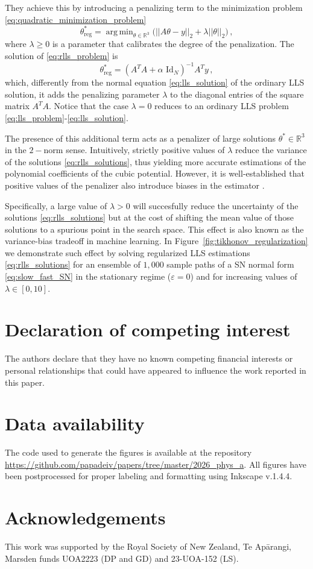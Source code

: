 \documentclass[a4paper,fleqn]{cas-sc}
\DeclareMathOperator*{\argmin}{\arg\,min}
\newcommand{\fref}[1]{Figure~\ref{#1}}
\begin{document}
They achieve this by introducing a penalizing term to the minimization problem \eqref{eq:quadratic_minimization_problem} 
\begin{equation}\label{eq:rlls_problem}
        \theta^*_{\text{reg}} = \argmin_{\theta\in\mathbb{R}^3}\big(||A\theta - y||_2 + \lambda||\theta||_2\big)\,,
\end{equation}
where $\lambda\geq0$ is a parameter that calibrates the degree of the penalization.
The solution of \eqref{eq:rlls_problem} is
\begin{equation}\label{eq:rlls_solutions}
        \theta^*_{\text{reg}} = (A^{T}A + \alpha\text{ Id}_N)^{-1}A^{T}y\,,
\end{equation}
which, differently from the normal equation \eqref{eq:lls_solution} of the ordinary LLS solution, it adds the penalizing parameter $\lambda$ to the diagonal entries of the square matrix $A^TA$.
Notice that the case $\lambda=0$ reduces to an ordinary LLS problem \eqref{eq:lls_problem}-\eqref{eq:lls_solution}.

The presence of this additional term acts as a penalizer of large solutions $\theta^*\in \mathbb{R}^{3}$ in the $2-$norm sense.
Intuitively, strictly positive values of $\lambda$ reduce the variance of the solutions \eqref{eq:rlls_solutions}, thus yielding more accurate estimations of the polynomial coefficients of the cubic potential.
However, it is well-established that positive values of the penalizer also introduce biases in the estimator \cite{Hoerl1970}.

Specifically, a large value of $\lambda>0$ will succesfully reduce the uncertainty of the solutions \eqref{eq:rlls_solutions} but at the cost of shifting the mean value of those solutions to a spurious point in the search space.
This effect is also known as the variance-bias tradeoff in machine learning. 
In \fref{fig:tikhonov_regularization} we demonstrate such effect by solving regularized LLS estimations \eqref{eq:rlls_solutions} for an ensemble of $1,000$ sample paths of a SN normal form \eqref{eq:slow_fast_SN} in the stationary regime ($\varepsilon=0$) and for increasing values of $\lambda\in[0,10]$.
\printcredits
%
\section*{Declaration of competing interest}
The authors declare that they have no known competing financial interests or personal relationships that could have appeared to influence the work reported in this paper.
%
\section*{Data availability}
The code used to generate the figures is available at the repository \url{https://github.com/papadeiv/papers/tree/master/2026_phys_a}.
All figures have been postprocessed for proper labeling and formatting using Inkscape v.1.4.4.
%
\section*{Acknowledgements}
This work was supported by the Royal Society of New Zealand, Te Ap\={a}rangi, Marsden funds UOA2223 (DP and GD) and 23-UOA-152 (LS).
%


\end{document}
